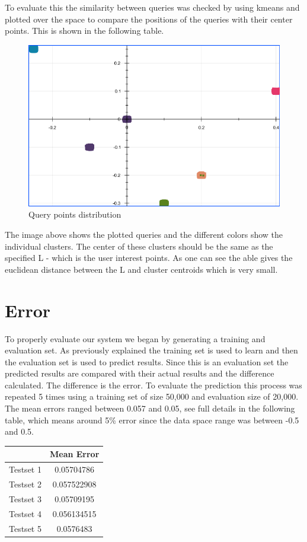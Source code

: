 \documentclass{lmproj}
\begin{document}
To evaluate this the similarity between queries was checked by using kmeans and plotted over the space to compare the positions of the queries with their center points. This is shown in the following table.

\begin{figure}[h]
\centering
\includegraphics[width=.7\textwidth]{inputOfQuery.png}
\caption{Query points distribution}
\label{qpd}
\end{figure}

The image above shows the plotted queries and the different colors show the individual clusters. The center of these clusters should be the same as the specified L - which is the user interest points. As one can see the able gives the euclidean distance between the L and cluster centroids which is very small.

\section{Error}
To properly evaluate our system we began by generating a training and evaluation set. As previously explained the training set is used to learn and then the evaluation set is used to predict results. Since this is an evaluation set the predicted results are compared with their actual results and the difference calculated. The difference is the error. To evaluate the prediction this process was repeated 5 times using a training set of size 50,000 and evaluation size of 20,000. The mean errors ranged between 0.057 and 0.05, see full details in the following table, which means around 5\% error since the data space range was between -0.5 and 0.5.

\begin{center}
 \label{table7}
\begin{tabular}{|c|c|}
	\hline   & Mean Error \\ 
	\hline Testset 1 & 0.05704786  \\ 
    \hline Testset 2 & 0.057522908   \\ 
	\hline Testset 3 & 0.05709195   \\ 
	\hline Testset 4 & 0.056134515   \\ 
	\hline Testset 5 & 0.0576483
   \\ 
	\hline
\end{tabular}
\end{center}
\end{document}
